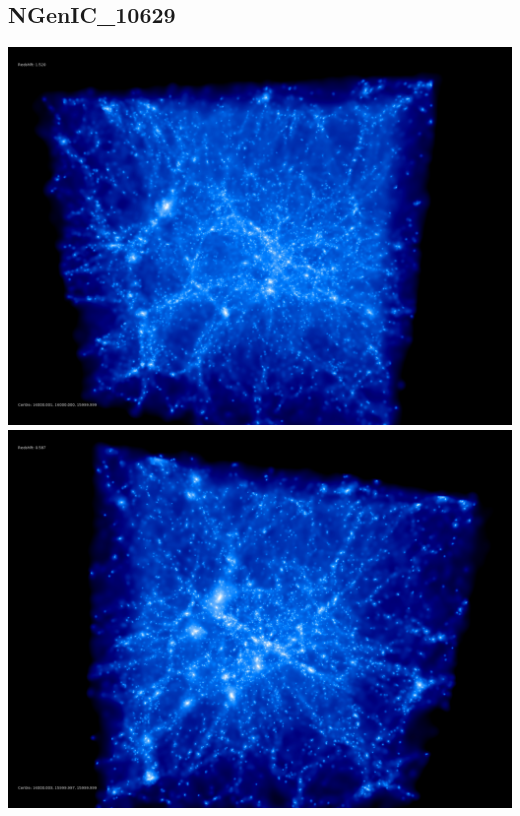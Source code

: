 % 
%
%
%
%
%
%
%


\newpage
\subsection{NGenIC\_10629}

\includegraphics[scale=0.1]{r256/NGenIC_10629/50.jpg} 
\includegraphics[scale=0.1]{r256/NGenIC_10629/100.jpg}  \\

